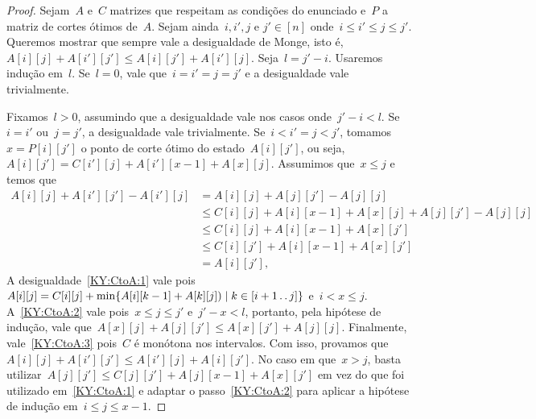 \begin{proof}
Sejam~$A$ e~$C$ matrizes que respeitam as condições do enunciado e~$P$ a matriz de cortes ótimos de~$A$. Sejam ainda~$i,i',j$ e $j' \in [n]$ onde~$i \leq i' \leq j \leq j'$. Queremos mostrar que sempre vale a desigualdade de Monge, isto é,~${A[i][j] + A[i'][j'] \leq A[i][j'] + A[i'][j]}$. Seja~$l = j' - i$. Usaremos indução em~$l$. Se~${l = 0}$, vale que~${i = i' = j = j'}$ e a desigualdade vale trivialmente.

Fixamos~$l > 0$, assumindo que a desigualdade vale nos casos onde~${j' - i < l}$. Se~$i = i'$ ou~$j = j'$, a desigualdade vale trivialmente. Se~${i < i' = j < j'}$, tomamos~${x = P[i][j']}$ o ponto de corte ótimo do estado~$A[i][j']$, ou seja,~${A[i][j'] = C[i'][j] + A[i'][x-1] + A[x][j]}$. Assumimos que~${x \leq j}$ e temos que
\begin{align}
A[i][j] + A[i'][j'] - A[i'][j] &= A[i][j] + A[j][j'] - A[j][j] \nonumber \\
                               &\leq C[i][j] + A[i][x-1] + A[x][j] + A[j][j'] - A[j][j] \label{KY:CtoA:1} \\
                               &\leq C[i][j] + A[i][x-1] + A[x][j'] \label{KY:CtoA:2} \\
                               &\leq C[i][j'] + A[i][x-1] + A[x][j'] \label{KY:CtoA:3} \\
                               &= A[i][j'] \text{,} \nonumber
\end{align}
A desigualdade~\eqref{KY:CtoA:1} vale pois~${A[i][j] = C[i][j] + \min\limits \{ A[i][k-1] + A[k][j]) \mid k \in [i+1 \,.\,.\, j]\} }$ e~${i < x \leq j}$. A~\eqref{KY:CtoA:2} vale pois~${x \leq j \leq j'}$ e~$j' - x < l$, portanto, pela hipótese de indução, vale que~${A[x][j] + A[j][j'] \leq A[x][j'] + A[j][j]}$. Finalmente, vale~\eqref{KY:CtoA:3} pois~$C$ é monótona nos intervalos. Com isso, provamos que~${A[i][j] + A[i'][j'] \leq A[i'][j] + A[i][j']}$. No caso em que~${x > j}$, basta utilizar~${A[j][j'] \leq C[j][j'] + A[j][x-1] + A[x][j']}$ em vez do que foi utilizado em~\eqref{KY:CtoA:1} e adaptar o passo~\eqref{KY:CtoA:2} para aplicar a hipótese de indução em~${i \leq j \leq x-1}$.


\end{proof}
